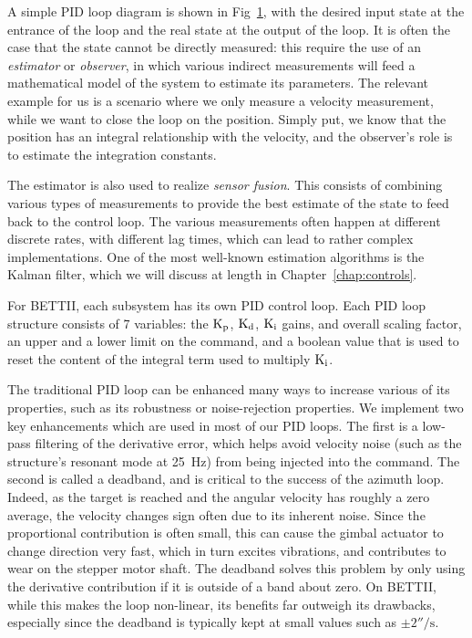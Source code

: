 \documentclass{standalone}
\begin{document}
\begin{figure}[!ht]
	\centering
	
	\caption{}
	\label{fig:SimplePID}
    \end{figure}



A simple PID loop diagram is shown in Fig~\ref{fig:SimplePID}, with the desired input state at the entrance of the loop and the real state at the output of the loop. It is often the case that the state cannot be directly measured: this require the use of an \textit{estimator} or \textit{observer}, in which various indirect measurements will feed a mathematical model of the system to estimate its parameters. The relevant example for us is a scenario where we only measure a velocity measurement, while we want to close the loop on the position. Simply put, we know that the position has an integral relationship with the velocity, and the observer's role is to estimate the integration constants.

The estimator is also used to realize \textit{sensor fusion}. This consists of combining various types of measurements to provide the best estimate of the state to feed back to the control loop. The various measurements often happen at different discrete rates, with different lag times, which can lead to rather complex implementations. One of the most well-known estimation algorithms is the Kalman filter, which we will discuss at length in Chapter~\ref{chap:controls}. 

For BETTII, each subsystem has its own PID control loop. Each PID loop structure consists of 7 variables: the $\textrm{K}_\textrm{p}$, $\textrm{K}_\textrm{d}$, $\textrm{K}_\textrm{i}$ gains, and overall scaling factor, an upper and a lower limit on the command, and a boolean value that is used to reset the content of the integral term used to multiply $\textrm{K}_\textrm{i}$. 

The traditional PID loop can be enhanced many ways to increase various of its properties, such as its robustness or noise-rejection properties. We implement two key enhancements which are used in most of our PID loops. The first is a low-pass filtering of the derivative error, which helps avoid velocity noise (such as the structure's resonant mode at \SI{25}{\hertz}) from being injected into the command. The second is called a deadband, and is critical to the success of the azimuth loop. Indeed, as the target is reached and the angular velocity has roughly a zero average, the velocity changes sign often due to its inherent noise. Since the proportional contribution is often small, this can cause the gimbal actuator to change direction very fast, which in turn excites vibrations, and contributes to wear on the stepper motor shaft. The deadband solves this problem by only using the derivative contribution if it is outside of a band about zero. On BETTII, while this makes the loop non-linear, its benefits far outweigh its drawbacks, especially since the deadband is typically kept at small values such as $\pm \ang{;;2}\si{\per\second}$.
\end{document}
